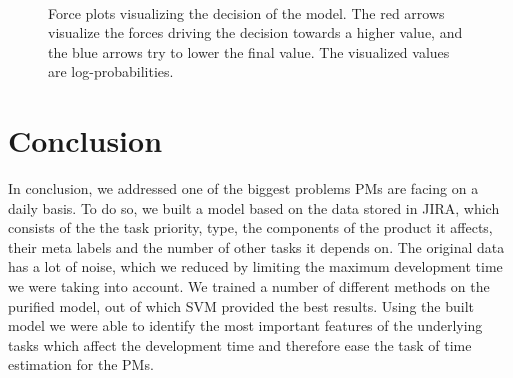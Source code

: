 \documentclass[conference,compsoc]{IEEEtran}
\begin{document}
\begin{figure}[!t]
	\centering
	 \\
	\label{force-plots}
	\caption{Force plots visualizing the decision of the model. The red arrows visualize the forces driving the decision towards a higher value, and the blue arrows try to lower the final value. The visualized values are log-probabilities.}
\end{figure}

\section{Conclusion}
In conclusion, we addressed one of the biggest problems PMs are facing on a daily basis. To do so, we built a model based on the data stored in JIRA, which consists of the the task priority, type, the components of the product it affects, their meta labels and the number of other tasks it depends on. The original data has a lot of noise, which we reduced by limiting the maximum development time we were taking into account. We trained a number of different methods on the purified model, out of which SVM provided the best results. Using the built model we were able to identify the most important features of the underlying tasks which affect the development time and therefore ease the task of time estimation for the PMs.




\end{document}
